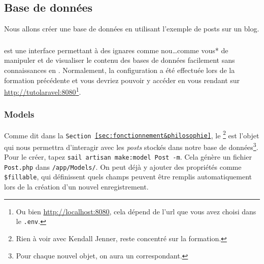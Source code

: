 \subsection{Base de données}
Nous allons créer une base de données en utilisant l'exemple de posts sur un blog.


\subsubsection[PHPMyAdmin][]{\phpmyadmin{}}
\phpmyadmin{} est une interface permettant à des ignares comme nou\ldots comme vous* de manipuler et de visualiser le contenu des bases de données facilement sans connaissances en \mysql. Normalement, la configuration a été effectuée lors de la formation précédente et vous devriez pouvoir y accéder en vous rendant sur \url{http://tutolaravel:8080}\footnote{Ou bien \url{http://localhost:8080}, cela dépend de l'url que vous avez choisi dans le \texttt{.env}.}.

\subsubsection[Models][laravel.com/docs/12.x/eloquent\#generating-model-classes]{Models}
Comme dit dans la \texttt{Section~\ref{sec:fonctionnement&philosophie}}, le \model{}\footnote{Rien à voir avec Kendall Jenner, reste concentré sur la formation.} est l'objet qui nous permettra d'interagir avec les \textit{posts} stockés dans notre base de données\footnote{Pour chaque nouvel objet, on aura un \model{} correspondant.}. 
Pour le créer, tapez \verb|sail artisan make:model Post -m|.  
Cela génère un fichier \verb|Post.php| dans \verb|/app/Models/|. On peut déjà y ajouter des propriétés comme \verb|$fillable|, qui définissent quels champs peuvent être remplis automatiquement lors de la création d'un nouvel enregistrement.

